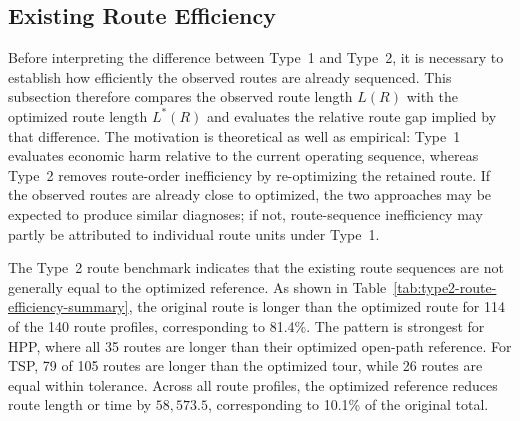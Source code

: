 \documentclass[preprint,12pt]{elsarticle}
\begin{document}
\subsection{Existing Route Efficiency}
\label{subsec:existing-route-efficiency}

Before interpreting the difference between Type~1 and Type~2, it is necessary to establish how efficiently the observed routes are already sequenced. This subsection therefore compares the observed route length $L(R)$ with the optimized route length $L^*(R)$ and evaluates the relative route gap implied by that difference. The motivation is theoretical as well as empirical: Type~1 evaluates economic harm relative to the current operating sequence, whereas Type~2 removes route-order inefficiency by re-optimizing the retained route. If the observed routes are already close to optimized, the two approaches may be expected to produce similar diagnoses; if not, route-sequence inefficiency may partly be attributed to individual route units under Type~1.

The Type~2 route benchmark indicates that the existing route sequences are not generally equal to the optimized reference. As shown in Table~\ref{tab:type2-route-efficiency-summary}, the original route is longer than the optimized route for 114 of the 140 route profiles, corresponding to 81.4\%. The pattern is strongest for HPP, where all 35 routes are longer than their optimized open-path reference. For TSP, 79 of 105 routes are longer than the optimized tour, while 26 routes are equal within tolerance. Across all route profiles, the optimized reference reduces route length or time by $58{,}573.5$, corresponding to 10.1\% of the original total.

\begin{table}[htbp]
\centering
\caption{Existing route efficiency under Type~2 optimization.}
\label{tab:type2-route-efficiency-summary}
\end{table}
\end{document}
